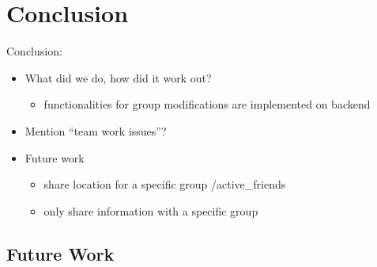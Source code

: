 \chapter{Conclusion}
\label{cha:conclusion}

Conclusion:
\begin{itemize}
    \item What did we do, how did it work out?
      \begin{itemize}
        \item functionalities for group modifications are implemented on backend
      \end{itemize}
    \item Mention \enquote{team work issues}?
    \item Future work
      \begin{itemize}
        \item share location for a specific group /active\_friends
        \item only share information with a specific group
      \end{itemize}
\end{itemize}


\vspace{0.5cm}

\section{Future Work}
